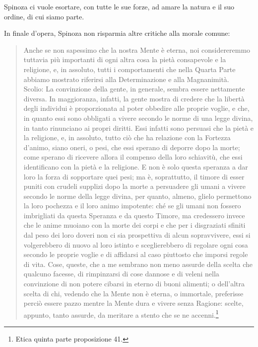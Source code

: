 Spinoza ci vuole esortare, con tutte le sue forze, ad amare la natura e il suo ordine, di cui siamo parte.

In finale d'opera, Spinoza non risparmia altre critiche alla morale comune:

\begin{quotation}
	\small Anche se non sapessimo che la nostra Mente è eterna, noi considereremmo tuttavia più
	importanti di ogni altra cosa la pietà consapevole e la religione, e, in assoluto, tutti i
	comportamenti che nella Quarta Parte abbiamo mostrato riferirsi alla Determinazione e alla Magnanimità.\\
	Scolio: La convinzione della gente, in generale, sembra essere nettamente diversa.
	In maggioranza, infatti, la gente mostra di credere che la libertà degli individui è proporzionata al poter obbedire alle proprie voglie, e che, in quanto essi sono obbligati a vivere secondo le norme di una legge divina, in tanto rinunciano ai propri diritti. Essi infatti sono
	persuasi che la pietà e la religione, e, in assoluto, tutto ciò che ha relazione con la Fortezza d’animo, siano oneri, o pesi, che essi sperano di deporre dopo la morte;
	come sperano di ricevere allora il compenso della loro schiavitù, che essi identificano con la pietà e la religione. E non è solo questa speranza a dar loro la forza di
	sopportare quei pesi; ma è, soprattutto, il timore di esser puniti con crudeli supplizi dopo
	la morte a persuadere gli umani a vivere secondo le norme della legge divina, per quanto,
	almeno, glielo permettono la loro pochezza e il loro animo impotente: ché se gli umani non
	fossero imbrigliati da questa Speranza e da questo Timore, ma credessero invece che le anime muoiano con la morte dei corpi e che per i disgraziati sfiniti dal peso dei loro doveri
	non ci sia prospettiva di alcun sopravvivere, essi si volgerebbero di nuovo al loro istinto e
	sceglierebbero di regolare ogni cosa secondo le proprie voglie e di affidarsi al caso piuttosto
	che imporsi regole di vita. Cose, queste, che a me sembrano non meno assurde della scelta
	che qualcuno facesse, di rimpinzarsi di cose dannose e di veleni nella convinzione di non
	potere cibarsi in eterno di buoni alimenti; o dell’altra scelta di chi, vedendo che la Mente
	non è eterna, o immortale, preferisse perciò essere pazzo mentre la Mente dura e vivere
	senza Ragione: scelte, appunto, tanto assurde, da meritare a stento che se ne accenni.\footnote{Etica quinta parte proposizione 41.}
\end{quotation}

